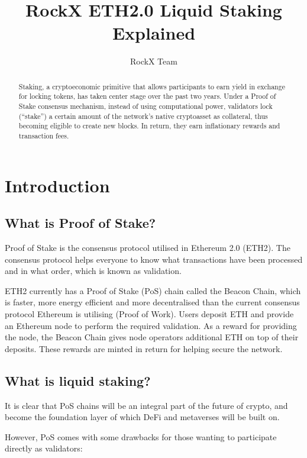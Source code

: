 \documentclass{article}
\title{RockX ETH2.0 Liquid Staking Explained}
\author{RockX Team}
\begin{document}
\maketitle

\begin{abstract}
Staking, a cryptoeconomic primitive that allows participants to earn yield in exchange for locking tokens, has taken center stage over the past two years. Under a Proof of Stake consensus mechanism, instead of using computational power, validators lock (“stake”) a certain amount of the network’s native cryptoasset as collateral, thus becoming eligible to create new blocks. In return, they earn inflationary rewards and transaction fees.
\end{abstract}

\section{Introduction}

\subsection{What is Proof of Stake?}

Proof of Stake is the consensus protocol utilised in Ethereum 2.0 (ETH2). The consensus protocol helps everyone to know what transactions have been processed and in what order, which is known as validation.\

ETH2 currently has a Proof of Stake (PoS) chain called the Beacon Chain, which is faster, more energy efficient and more decentralised than the current consensus protocol Ethereum is utilising (Proof of Work). Users deposit ETH and provide an Ethereum node to perform the required validation. As a reward for providing the node, the Beacon Chain gives node operators additional ETH on top of their deposits. These rewards are minted in return for helping secure the network.

\subsection{What is liquid staking?}

It is clear that PoS chains will be an integral part of the future of crypto, and become the foundation layer of which DeFi and metaverses will be built on.

However, PoS comes with some drawbacks for those wanting to participate directly as validators:
\end{document}
